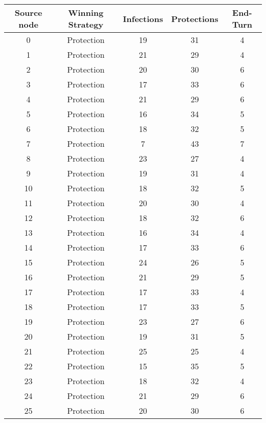 \documentclass[results.tex]{subfiles}
\begin{document}
\begin{center}
  \begin{tabular}{| c || c | c | c | c |}
    \hline
    {\bfseries Source node} & {\bfseries Winning Strategy} & {\bfseries Infections} & {\bfseries Protections} & {\bfseries End-Turn} \\  %
    \hline\hline
    0 & Protection & 19 & 31 & 4 \\ 
    \hline
    1 & Protection & 21 & 29 & 4 \\ 
    \hline
    2 & Protection & 20 & 30 & 6 \\ 
    \hline
    3 & Protection & 17 & 33 & 6 \\ 
    \hline
    4 & Protection & 21 & 29 & 6 \\ 
    \hline
    5 & Protection & 16 & 34 & 5 \\ 
    \hline
    6 & Protection & 18 & 32 & 5 \\ 
    \hline
    7 & Protection & 7 & 43 & 7 \\ 
    \hline
    8 & Protection & 23 & 27 & 4 \\ 
    \hline
    9 & Protection & 19 & 31 & 4 \\ 
    \hline
    10 & Protection & 18 & 32 & 5 \\ 
    \hline
    11 & Protection & 20 & 30 & 4 \\ 
    \hline
    12 & Protection & 18 & 32 & 6 \\ 
    \hline
    13 & Protection & 16 & 34 & 4 \\ 
    \hline
    14 & Protection & 17 & 33 & 6 \\ 
    \hline
    15 & Protection & 24 & 26 & 5 \\ 
    \hline
    16 & Protection & 21 & 29 & 5 \\ 
    \hline
    17 & Protection & 17 & 33 & 4 \\ 
    \hline
    18 & Protection & 17 & 33 & 5 \\ 
    \hline
    19 & Protection & 23 & 27 & 6 \\ 
    \hline
    20 & Protection & 19 & 31 & 5 \\ 
    \hline
    21 & Protection & 25 & 25 & 4 \\ 
    \hline
    22 & Protection & 15 & 35 & 5 \\ 
    \hline
    23 & Protection & 18 & 32 & 4 \\ 
    \hline
    24 & Protection & 21 & 29 & 6 \\ 
    \hline
    25 & Protection & 20 & 30 & 6 \\ 

\end{tabular}
\end{center}
\end{document}
